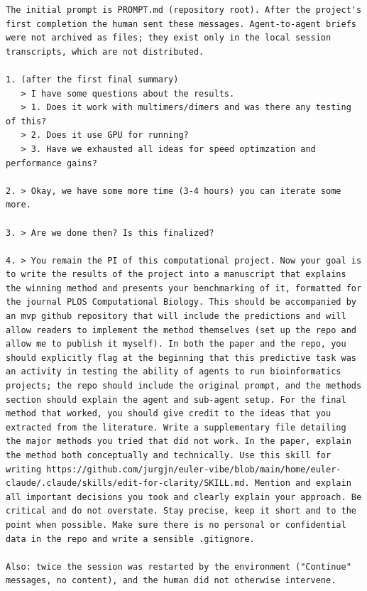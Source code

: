 \documentclass[10pt,letterpaper]{article}
\begin{document}
\begin{Verbatim}[breaklines,breakanywhere,fontsize=\footnotesize]
The initial prompt is PROMPT.md (repository root). After the project's first completion the human sent these messages. Agent-to-agent briefs were not archived as files; they exist only in the local session transcripts, which are not distributed.

1. (after the first final summary)
   > I have some questions about the results.
   > 1. Does it work with multimers/dimers and was there any testing of this?
   > 2. Does it use GPU for running?
   > 3. Have we exhausted all ideas for speed optimzation and performance gains?

2. > Okay, we have some more time (3-4 hours) you can iterate some more.

3. > Are we done then? Is this finalized?

4. > You remain the PI of this computational project. Now your goal is to write the results of the project into a manuscript that explains the winning method and presents your benchmarking of it, formatted for the journal PLOS Computational Biology. This should be accompanied by an mvp github repository that will include the predictions and will allow readers to implement the method themselves (set up the repo and allow me to publish it myself). In both the paper and the repo, you should explicitly flag at the beginning that this predictive task was an activity in testing the ability of agents to run bioinformatics projects; the repo should include the original prompt, and the methods section should explain the agent and sub-agent setup. For the final method that worked, you should give credit to the ideas that you extracted from the literature. Write a supplementary file detailing the major methods you tried that did not work. In the paper, explain the method both conceptually and technically. Use this skill for writing https://github.com/jurgjn/euler-vibe/blob/main/home/euler-claude/.claude/skills/edit-for-clarity/SKILL.md. Mention and explain all important decisions you took and clearly explain your approach. Be critical and do not overstate. Stay precise, keep it short and to the point when possible. Make sure there is no personal or confidential data in the repo and write a sensible .gitignore.

Also: twice the session was restarted by the environment ("Continue" messages, no content), and the human did not otherwise intervene.
\end{Verbatim}
\end{document}

